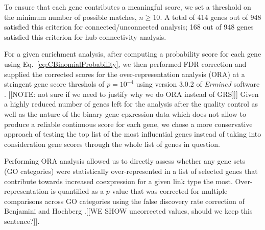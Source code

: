 \documentclass[10pt,letterpaper]{article}
\begin{document}
To ensure that each gene contributes a meaningful score, we set a threshold on the minimum number of possible matches, $n \geq 10$.
A total of 414 genes out of 948 satisfied this criterion for connected/unconnected analysis; 168 out of 948 genes satisfied this criterion for hub connectivity analysis.

For a given enrichment analysis, after computing a probability score for each gene using Eq.~\eqref{eq:CBinomialProbability}, we then performed FDR correction and supplied the corrected scores for the over-representation analysis (ORA) at a stringent gene score threshols of $p=10^{-4}$ using version 3.0.2 of \emph{ErmineJ} software \cite{Gillis2010}.
[[NOTE: not sure if we need to justify why we do ORA instead of GRS]]]
Given a highly reduced number of genes left for the analysis after the quality control as well as the nature of the binary gene epxression data which does not allow to produce a reliable continuous score for each gene, we chose a more conservative approach of testing the top list of the most influential genes instead of taking into consideration gene scores through the whole list of genes in question.

Performing ORA analysis allowed us to directly assess whether any gene sets (GO categories) were statistically over-represented in a list of selected genes that contribute towards increased coexpression for a given link type the most. Over-representation is quantified as a $p$-value that was corrected for multiple comparisons across GO categories using the false discovery rate correction of Benjamini and Hochberg \cite{Benjamini:1995cd}.[[WE SHOW uncorrected values, should we keep this sentence?]].
\end{document}
